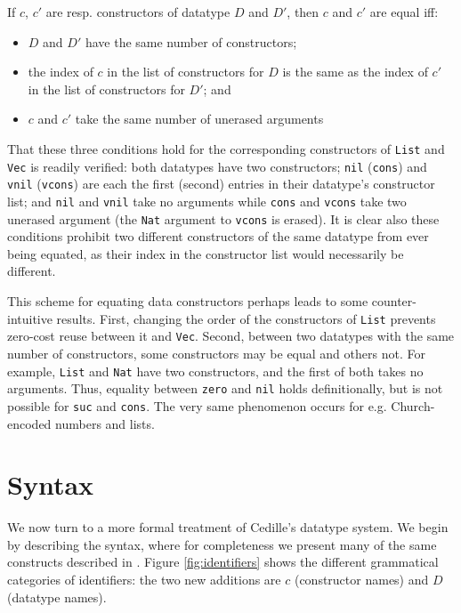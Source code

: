 \documentclass{article}
\begin{document}
If $c$, $c{'}$ are resp. constructors of
datatype $D$ and $D'$, then $c$ and $c{'}$ are equal iff:
\begin{itemize}
\item $D$ and $D{'}$ have the same number of constructors;
\item the index of $c$ in the list of constructors for $D$ is the same as
  the index of $c{'}$ in the list of constructors for $D'$; and
\item $c$ and $c{'}$ take the same number of unerased arguments
\end{itemize}

That these three conditions hold for the corresponding constructors of
\texttt{List} and \texttt{Vec} is readily verified: both datatypes have two
constructors; \texttt{nil} (\texttt{cons}) and \texttt{vnil} (\texttt{vcons})
are each the first (second) entries in their datatype's constructor list; and
\texttt{nil} and \texttt{vnil} take no arguments while \texttt{cons} and
\texttt{vcons} take two unerased argument (the \texttt{Nat} argument to
\texttt{vcons} is erased). It is clear also these conditions
prohibit two different constructors of the same datatype from ever being
equated, as their index in the constructor list would necessarily be different.

This scheme for equating data constructors perhaps leads to some
counter-intuitive results. First, changing the order of the constructors of
\texttt{List} prevents zero-cost reuse between it and \texttt{Vec}. Second,
between two datatypes with the same number of constructors, some constructors
may be equal and others not. For example, \texttt{List} and \texttt{Nat} have
two constructors, and the first of both takes no arguments. Thus, equality
between \texttt{zero} and \texttt{nil} holds definitionally, but is not possible for
\texttt{suc} and \texttt{cons}. The very same phenomenon occurs for e.g.
Church-encoded numbers and lists.

\newpage
\section{Syntax}
\label{sec:syntax}

We now turn to a more formal treatment of Cedille's datatype system. We begin by
describing the syntax, where for completeness we present many of the same
constructs described in \cite{St18_Cedille-Syntax-Semantics}. Figure
\ref{fig:identifiers} shows the different grammatical categories of identifiers:
the two new additions are $c$ (constructor names) and $D$ (datatype names).
\end{document}

